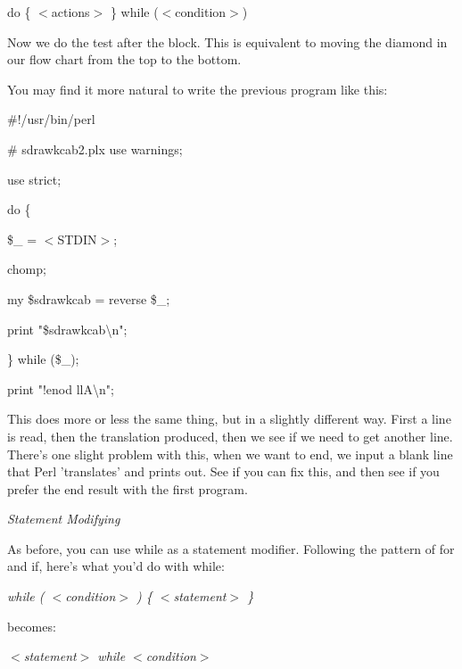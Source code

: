 \documentclass[a4paper,11pt]{book}
\begin{document}
\noindent do \{ $<$actions$>$ \} while ($<$condition$>$)

\noindent 

\noindent Now we do the test after the block. This is equivalent to moving the diamond in our flow chart from the top to the bottom.

\noindent 

\noindent You may find it more natural to write the previous program like this:

\noindent 

\noindent 

\noindent \#!/usr/bin/perl

\noindent \# sdrawkcab2.plx use warnings;

\noindent use strict;

\noindent 

\noindent do \{

\noindent \$\_  = $<$STDIN$>$;

\noindent chomp;

\noindent my \$sdrawkcab = reverse \$\_;

\noindent print "\$sdrawkcab\textbackslash n";

\noindent \} while (\$\_);

\noindent print "!enod llA\textbackslash n";

\noindent 

\noindent This does more or less the same thing, but in a slightly different way. First a line is read, then the translation produced, then we see if we need to get another line. There's one slight problem with this, when we want to end, we input a blank line that Perl 'translates' and prints out. See if you can fix this, and then see if you prefer the end result with the first program.

\noindent 

\noindent \textit{Statement Modifying}

\noindent As before, you can use while as a statement modifier. Following the pattern of for and if, here's what you'd do with while:

\noindent 

\noindent 

\noindent \textit{while ( $<$condition$>$ ) \{ $<$statement$>$ \}}

\noindent 

\noindent becomes:

\noindent 

\noindent 

\noindent \textit{$<$statement$>$ while $<$condition$>$}
\end{document}
